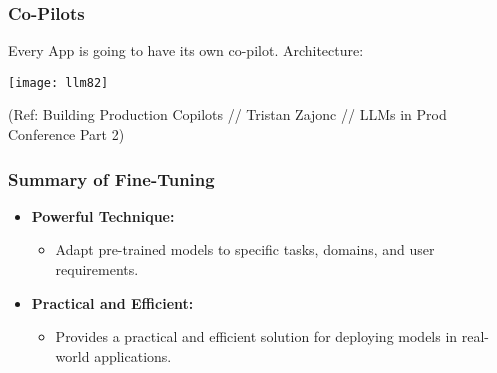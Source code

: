 \begin{frame}[fragile]\frametitle{Co-Pilots}

Every App is going to have its own co-pilot. Architecture:

\begin{center}
\texttt{[image: llm82]}
\end{center}

{\tiny (Ref: Building Production Copilots // Tristan Zajonc // LLMs in Prod Conference Part 2)}
\end{frame}

\begin{frame}[fragile]\frametitle{Summary of Fine-Tuning}
  \begin{itemize}
    \item \textbf{Powerful Technique:}
      \begin{itemize}
        \item Adapt pre-trained models to specific tasks, domains, and user requirements.
      \end{itemize}
    \item \textbf{Practical and Efficient:}
      \begin{itemize}
        \item Provides a practical and efficient solution for deploying models in real-world applications.
      \end{itemize}
  \end{itemize}
\end{frame}


